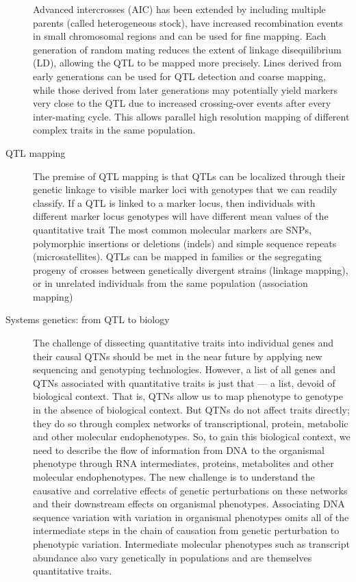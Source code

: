 \documentclass[a4paper,10pt]{article}
\begin{document}
\begin{description}
Advanced intercrosses (AIC) has been extended by including multiple parents (called heterogeneous stock), have increased recombination events in small chromosomal regions and can be used for fine mapping. 
Each generation of random mating reduces the extent of linkage disequilibrium (LD), allowing the QTL to be mapped more precisely. 
Lines derived from early generations can be used for QTL detection and coarse mapping, while those derived from later generations may potentially yield markers very close to the QTL due to increased crossing-over events
after every inter-mating cycle. This allows parallel high resolution mapping of different complex traits in the same population.






\item[QTL mapping ] 
% 
% 
The premise of QTL mapping is that QTLs can be localized through their genetic linkage to visible marker loci with genotypes that we can readily classify.
If a QTL is linked to a marker locus, then individuals with different marker locus genotypes will have different mean values of the quantitative trait
The most common molecular markers are SNPs, polymorphic insertions or deletions (indels) and simple sequence repeats (microsatellites).
QTLs can be mapped in families or the segregating progeny of crosses between genetically divergent strains (linkage mapping), or in unrelated individuals from the same population (association mapping)


\item [Systems genetics: from QTL to biology]
The challenge of dissecting quantitative traits into individual genes and their causal QTNs should be met in the near future by applying new sequencing and genotyping technologies.
However, a list of all genes and QTNs associated with quantitative traits is just that — a list, devoid of biological context. 
That is, QTNs allow us to map phenotype to genotype in the absence of biological context. 
But QTNs do not affect traits directly; they do so through complex networks of transcriptional, protein, metabolic and other molecular endophenotypes. 
So, to gain this biological context, we need to describe the flow of information from DNA to the organismal phenotype through RNA intermediates, proteins, metabolites and other molecular endophenotypes.
The new challenge is to understand the causative and correlative effects of genetic perturbations on these networks and their downstream effects on organismal phenotypes.
Associating DNA sequence variation with variation in organismal phenotypes omits all of the intermediate steps in the chain of causation from genetic perturbation to phenotypic variation.
Intermediate molecular phenotypes such as transcript abundance also vary genetically in populations and are themselves quantitative traits.


\end{description}
\end{document}
